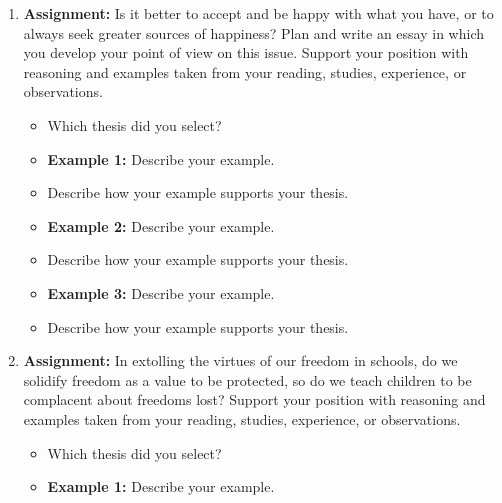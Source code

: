 \begin{enumerate}

\item \textbf{Assignment:} Is it better to accept and be happy with what you have, or to always seek greater sources of happiness? Plan and write an essay in which you develop your point of view on this issue. Support your position with reasoning and examples taken from your reading, studies, experience, or observations.

\begin{spacing}{1.5}
\begin{itemize}
\item Which thesis did you select? \hrulefill
\item \textbf{Example 1:} Describe your example. \hrulefill

\hrulefill

\item Describe how your example supports your thesis. \hrulefill

\hrulefill

\item \textbf{Example 2:} Describe your example. \hrulefill

\hrulefill

\item Describe how your example supports your thesis. \hrulefill

\hrulefill

\item \textbf{Example 3:} Describe your example. \hrulefill

\hrulefill

\item Describe how your example supports your thesis. \hrulefill

\hrulefill
\end{itemize}
\end{spacing}

\item \textbf{Assignment:} In extolling the virtues of our freedom in schools, do we solidify freedom as a value to be protected, so do we teach children to be complacent about freedoms lost? Support your position with reasoning and examples taken from your reading, studies, experience, or observations.

\begin{spacing}{1.5}
\begin{itemize}
\item Which thesis did you select? \hrulefill
\item \textbf{Example 1:} Describe your example. \hrulefill


\end{itemize}
\end{spacing}
\end{enumerate}
